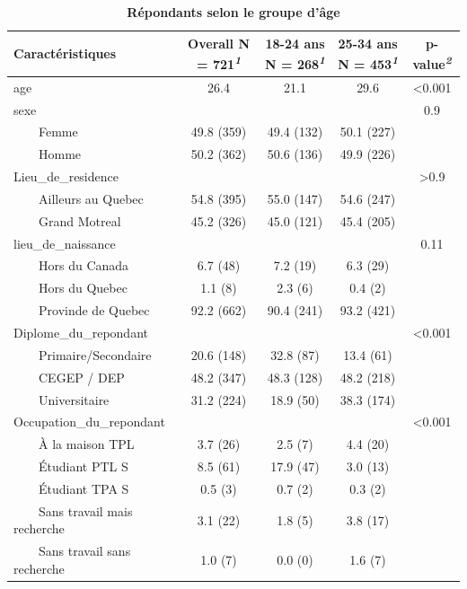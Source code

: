\documentclass[
]{article}
\begin{document}
\newpage
\begin{table}[!t]
\caption{\label{tab:unnamed-chunk-5}\textbf{Répondants selon le groupe d'âge}} 
\fontsize{12.0pt}{14.4pt}\selectfont
\begin{tabular*}{\linewidth}{@{\extracolsep{\fill}}lcccc}
\toprule
\textbf{Caractéristiques} & \textbf{Overall}  N = 721\textsuperscript{\textit{1}} & \textbf{18-24 ans}  N = 268\textsuperscript{\textit{1}} & \textbf{25-34 ans}  N = 453\textsuperscript{\textit{1}} & \textbf{p-value}\textsuperscript{\textit{2}} \\ 
\midrule\addlinespace[2.5pt]
age & 26.4 & 21.1 & 29.6 & <0.001 \\ 
sexe &  &  &  & 0.9 \\ 
    Femme & 49.8   (359) & 49.4   (132) & 50.1   (227) &  \\ 
    Homme & 50.2   (362) & 50.6   (136) & 49.9   (226) &  \\ 
Lieu\_de\_residence &  &  &  & >0.9 \\ 
    Ailleurs au Quebec & 54.8   (395) & 55.0   (147) & 54.6   (247) &  \\ 
    Grand Motreal & 45.2   (326) & 45.0   (121) & 45.4   (205) &  \\ 
lieu\_de\_naissance &  &  &  & 0.11 \\ 
    Hors du Canada & 6.7   (48) & 7.2   (19) & 6.3   (29) &  \\ 
    Hors du Quebec & 1.1   (8) & 2.3   (6) & 0.4   (2) &  \\ 
    Provinde de Quebec & 92.2   (662) & 90.4   (241) & 93.2   (421) &  \\ 
Diplome\_du\_repondant &  &  &  & <0.001 \\ 
    Primaire/Secondaire & 20.6   (148) & 32.8   (87) & 13.4   (61) &  \\ 
    CEGEP / DEP & 48.2   (347) & 48.3   (128) & 48.2   (218) &  \\ 
    Universitaire & 31.2   (224) & 18.9   (50) & 38.3   (174) &  \\ 
Occupation\_du\_repondant &  &  &  & <0.001 \\ 
    À la maison TPL & 3.7   (26) & 2.5   (7) & 4.4   (20) &  \\ 
    Étudiant PTL S & 8.5   (61) & 17.9   (47) & 3.0   (13) &  \\ 
    Étudiant TPA S & 0.5   (3) & 0.7   (2) & 0.3   (2) &  \\ 
    Sans travail mais recherche & 3.1   (22) & 1.8   (5) & 3.8   (17) &  \\ 
    Sans travail sans recherche & 1.0   (7) & 0.0   (0) & 1.6   (7) &  \\ 

\end{tabular*}
\end{table}
\end{document}
